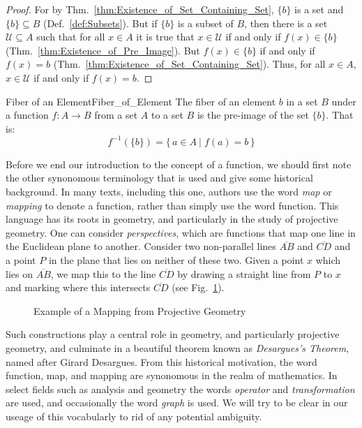         \begin{proof}
            For by Thm.~\ref{thm:Existence_of_Set_Containing_Set}, $\{b\}$ is
            a set and $\{b\}\subseteq{B}$ (Def.~\ref{def:Subsets}). But if
            $\{b\}$ is a subset of $B$, then there is a set
            $\mathcal{U}\subseteq{A}$ such that for all $x\in{A}$ it is true
            that $x\in\mathcal{U}$ if and only if $f(x)\in\{b\}$
            (Thm.~\ref{thm:Existence_of_Pre_Image}). But $f(x)\in\{b\}$ if and
            only if $f(x)=b$ (Thm.~\ref{thm:Existence_of_Set_Containing_Set}).
            Thus, for all $x\in{A}$, $x\in\mathcal{U}$ if and only if $f(x)=b$.
        \end{proof}
        \begin{fdefinition}{Fiber of an Element}{Fiber_of_Element}
            The \gls{fiber} of an element $b$ in a \gls{set} $B$ under a
            \gls{function} $f:A\rightarrow{B}$ from a set $A$ to a set $B$ is
            the pre-image of the set $\{b\}$. That is:
            \begin{equation*}
                f^{\minus{1}}(\{b\})
                =\big\{\,a\in{A}\:|\;f(a)=b\,\big\}
            \end{equation*}
        \end{fdefinition}
        Before we end our introduction to the concept of a function, we should
        first note the other synonomous terminology that is used and give some
        historical background. In many texts, including this one, authors use
        the word \textit{map} or \textit{mapping} to denote a function, rather
        than simply use the word function. This language has its roots in
        geometry, and particularly in the study of projective geometry. One can
        consider \textit{perspectives}, which are functions that map one line in
        the Euclidean plane to another. Consider two non-parallel lines
        $\overline{AB}$ and $\overline{CD}$ and a point $P$ in the plane that
        lies on neither of these two. Given a point $x$ which lies on
        $\overline{AB}$, we map this to the line $\overline{CD}$ by drawing a
        straight line from $P$ to $x$ and marking where this intersects
        $\overline{CD}$
        (see Fig.~\ref{fig:Example_of_Map_from_Projective_Geometry}).
        \begin{figure}[H]
            \centering
            \captionsetup{type=figure}
            
            \caption{Example of a Mapping from Projective Geometry}
            \label{fig:Example_of_Map_from_Projective_Geometry}
        \end{figure}
        Such constructions play a central role in geometry, and particularly
        projective geometry, and culminate in a beautiful theorem known as
        \textit{Desargues's Theorem}, named after
        Girard Desargues. From this historical motivation, the word function,
        map, and mapping are synonomous in the realm of mathematics. In select
        fields such as analysis and geometry the words \textit{operator} and
        \textit{transformation} are used, and occasionally the word
        \textit{graph} is used. We will try to be clear in our useage of this
        vocabularly to rid of any potential ambiguity.
